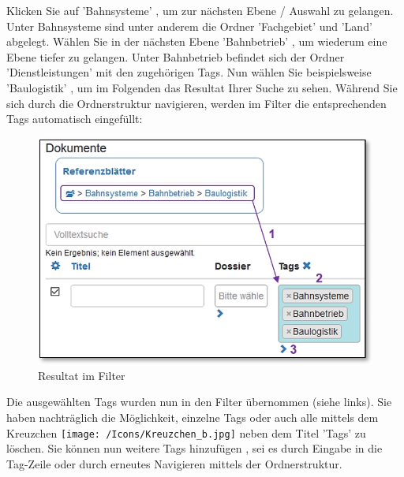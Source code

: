 Klicken Sie auf 'Bahnsysteme' , um zur nächsten Ebene / Auswahl zu gelangen. Unter Bahnsysteme sind unter anderem die Ordner 'Fachgebiet' und 'Land' abgelegt. Wählen Sie in der nächsten Ebene 'Bahnbetrieb' , um wiederum eine Ebene tiefer zu gelangen. Unter Bahnbetrieb befindet sich der Ordner 'Dienstleistungen' mit den zugehörigen Tags. Nun wählen Sie beispielsweise 'Baulogistik' , um im Folgenden das Resultat Ihrer Suche zu sehen. Während Sie sich durch die Ordnerstruktur navigieren, werden im Filter die entsprechenden Tags automatisch eingefüllt:

\vspace{\baselineskip}

\begin{figure}   %
  \vspace{-20pt}      %
  \begin{center}
    \includegraphics[width=1\linewidth]{../chapters/11_Dokumentenablage/pictures//11-htag_Tags.jpg}
  \end{center}
  \vspace{-20pt}
  \caption{Resultat im Filter}
  \vspace{-10pt}
\end{figure}

Die ausgewählten Tags wurden nun in den Filter übernommen  (siehe links). Sie haben nachträglich die Möglichkeit, einzelne Tags oder auch alle mittels dem Kreuzchen \texttt{[image: /Icons/Kreuzchen\_b.jpg]} neben dem Titel 'Tags' zu löschen. Sie können nun weitere Tags hinzufügen , sei es durch Eingabe in die Tag-Zeile oder durch erneutes Navigieren mittels der Ordnerstruktur. 

